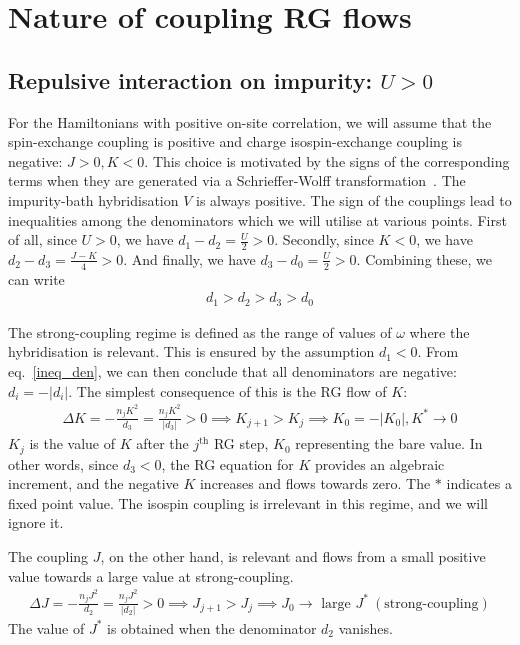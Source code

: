 \section{Nature of coupling RG flows}
\subsection{Repulsive interaction on impurity: \(U>0\)}
For the Hamiltonians with positive on-site correlation, we will assume that the spin-exchange coupling is positive and charge isospin-exchange coupling is negative: \(J>0, K<0\). This choice is motivated by the signs of the corresponding terms when they are generated via a Schrieffer-Wolff transformation~\cite{schrieffer1966}. The impurity-bath hybridisation \(V\) is always positive. The sign of the couplings lead to inequalities among the denominators which we will utilise at various points. First of all, since \(U>0\), we have \(d_1 - d_2 = \frac{U}{2} > 0\). Secondly, since \(K<0\), we have \(d_2 - d_3 = \frac{J-K}{4} > 0\). And finally, we have \(d_3 - d_0 = \frac{U}{2} > 0\). Combining these, we can write
\begin{equation}\begin{aligned}
	\label{ineq_den}
	d_1 > d_2 > d_3 > d_0
\end{aligned}\end{equation}

The strong-coupling regime is defined as the range of values of \(\omega\) where the hybridisation is relevant. This is ensured by the assumption \(d_1<0\). From eq.~\ref{ineq_den}, we can then conclude that all denominators are negative: \(d_i = - |d_i|\). The simplest consequence of this is the RG flow of \(K\):
\begin{equation}\begin{aligned}
	\Delta K= -\frac{n_j K^2}{d_3} = \frac{n_j K^2}{|d_3|} > 0 \implies K_{j+1} > K_j \implies K_0 = -|K_0|, K^* \to 0
\end{aligned}\end{equation}
\(K_j\) is the value of \(K\) after the \(j^\text{th}\) RG step, \(K_0\) representing the bare value.
In other words, since \(d_3 < 0\), the RG equation for \(K\) provides an algebraic increment, and the negative \(K\) increases and flows towards zero. The \(*\) indicates a fixed point value. The isospin coupling is irrelevant in this regime, and we will ignore it.

The coupling \(J\), on the other hand, is relevant and flows from a small positive value towards a large value at strong-coupling.
\begin{equation}\begin{aligned}
	\Delta J= -\frac{n_j J^2}{d_2} = \frac{n_j J^2}{|d_2|} > 0 \implies J_{j+1} > J_j \implies J_0 \to \text{ large } J^* ~(\text{strong-coupling})
\end{aligned}\end{equation}
The value of \(J^*\) is obtained when the denominator \(d_2\) vanishes.

